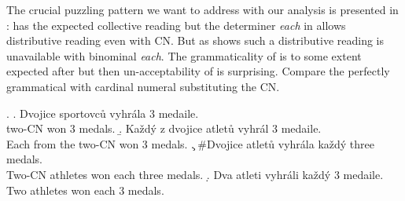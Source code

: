 \documentclass[12pt, a4paper]{scrartcl}
\begin{document}
The crucial puzzling pattern we want to address with our analysis is presented in \Next: \Next[a] has the expected collective reading but the determiner \textit{each} in \Next[b] allows distributive reading even with CN. But as \Next[c] shows such a distributive reading is unavailable with binominal \textit{each}. The grammaticality of \Next[b] is to some extent expected after \Last[b] but then un-acceptability of \Next[c] is surprising. Compare the perfectly grammatical \Next[d] with cardinal numeral substituting the CN. 

\ex. \a. Dvojice sportovců vyhrála 3 medaile.\label{ex:dvojice-cum}\\
two-CN won 3 medals.
\b. Každý z dvojice atletů vyhrál 3 medaile.\label{ex:dvojice-det-each}\\
Each from the two-CN won 3 medals.
\c. \#Dvojice atletů vyhrála každý three medals.\label{ex:dvojice-bin-each}\\
Two-CN athletes won each three medals.
\d. Dva atleti vyhráli každý 3 medaile.\label{ex:dva-bin-each}\\
Two athletes won each 3 medals.
\end{document}
